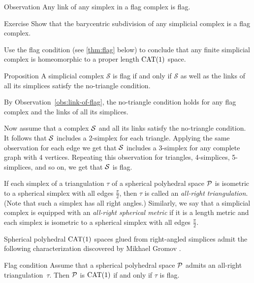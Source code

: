 \begin{thm}{Observation}\label{obs:link-of-flag}
Any link of any simplex in a flag complex is flag.
\end{thm}

\begin{thm}[!]{Exercise}\label{ex:baricenric-flag}
Show that the barycentric subdivision of any simplicial complex is a flag complex.

Use the flag condition (see \ref{thm:flag} below)
to conclude that any finite simplicial complex is homeomorphic to a proper length $\mathrm{CAT}(1)$ space.

\end{thm}


\begin{thm}{Proposition}\label{prop:no-trig}
A simplicial complex $\mathcal{S}$ is flag if and only if 
$\mathcal{S}$ as well as the links of all its simplices
satisfy the no-triangle condition.
\end{thm}

By Observation~\ref{obs:link-of-flag}, the no-triangle condition holds 
for any flag complex and the links of all its simplices.

Now assume that a complex $\mathcal{S}$ and all its links satisfy 
the no-triangle condition.
It follows that $\mathcal{S}$ includes a 2-simplex for each triangle.
Applying the same observation for each edge we get that $\mathcal{S}$ 
includes a 3-simplex for any complete graph with 4 vertices.
Repeating this observation 
for triangles, 
4-simplices,
5-simplices,
and so on, we get that $\mathcal{S}$ is flag.
\qeds


If each simplex of a triangulation $\tau$ of a spherical polyhedral space $\mathcal{P}$ is isometric to a spherical simplex with all edges $\tfrac\pi2$,
then $\tau$ is called an \emph{all-right triangulation}.
(Note that such a simplex has all right angles.)
Similarly, we say that a simplicial complex 
is equipped with an \emph{all-right spherical metric}
if it is a length metric and each simplex is isometric 
to a spherical simplex with all edges $\tfrac\pi2$.

Spherical polyhedral $\mathrm{CAT}(1)$ spaces glued from right-angled simplices
admit the following characterization 
discovered by Mikhael Gromov \cite[p.~122]{gromov-1987}.

\begin{thm}{Flag condition}\label{thm:flag}
Assume that a spherical polyhedral space $\mathcal{P}$
admits an all-right triangulation~$\tau$.
Then $\mathcal{P}$ is $\mathrm{CAT}(1)$
if and only if $\tau$ is flag.
\end{thm}

